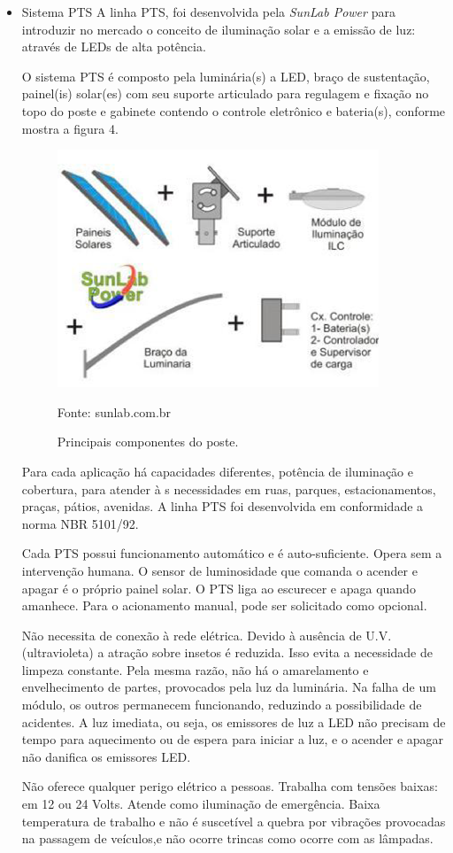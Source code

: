 \begin{itemize}
	\item Sistema PTS
	A linha PTS, foi desenvolvida pela \textit{SunLab Power} para introduzir no mercado o conceito de iluminação solar e a emissão de luz: através de LEDs de alta potência. 
	
	O sistema PTS é composto pela luminária(s) a LED, braço de sustentação, painel(is) solar(es) com seu suporte articulado para regulagem e fixação no topo do poste e gabinete contendo o controle eletrônico e bateria(s), conforme mostra a figura 4.
	
	\begin{figure}[H]
	 \centering
	\label{Principais componentes do poste}
	 \includegraphics[keepaspectratio=true,scale=0.8]{postes/5.png}
	 \caption{Principais componentes do poste.}
	 \small{Fonte: sunlab.com.br}
	\end{figure}
	
	Para cada aplicação há capacidades diferentes, potência de iluminação e cobertura, para atender à s necessidades em ruas, parques, estacionamentos, praças, pátios, avenidas. A linha PTS foi desenvolvida em conformidade a norma NBR 5101/92. 
	
	Cada PTS possui funcionamento automático e é auto-suficiente. Opera sem a intervenção humana. O sensor de luminosidade que comanda o acender e apagar é o próprio painel solar. O PTS liga ao escurecer e apaga quando amanhece. Para o acionamento manual, pode ser solicitado como opcional. 
	
	Não necessita de conexão à  rede elétrica.  Devido à  ausência de U.V. (ultravioleta) a atração sobre insetos é reduzida. Isso evita a necessidade de limpeza constante. Pela mesma razão, não há o amarelamento e envelhecimento de partes, provocados pela luz da luminária.  Na falha de um módulo, os outros permanecem funcionando, reduzindo a possibilidade de acidentes.  A luz imediata, ou seja, os emissores de luz a LED não precisam de tempo para aquecimento ou de espera para iniciar a luz, e  o acender e apagar não danifica os emissores LED.
	
	Não oferece qualquer perigo elétrico a pessoas. Trabalha com tensões baixas: em 12 ou 24 Volts. Atende como iluminação de emergência.  Baixa temperatura de trabalho e não é suscetível a quebra por vibrações provocadas na passagem de veículos,e não ocorre trincas como ocorre com as lâmpadas. 	
\end{itemize}

